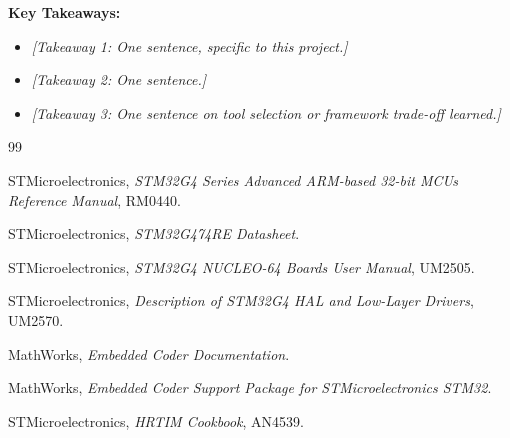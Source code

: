 \textbf{Key Takeaways:}

\begin{itemize}
    \item \textit{[Takeaway 1: One sentence, specific to this project.]}
    \item \textit{[Takeaway 2: One sentence.]}
    \item \textit{[Takeaway 3: One sentence on tool selection or
          framework trade-off learned.]}
\end{itemize}

\newpage

\begin{thebibliography}{99}

STMicroelectronics, \textit{STM32G4 Series Advanced ARM-based
32-bit MCUs Reference Manual}, RM0440.

STMicroelectronics, \textit{STM32G474RE Datasheet}.

STMicroelectronics, \textit{STM32G4 NUCLEO-64 Boards User
Manual}, UM2505.

STMicroelectronics, \textit{Description of STM32G4 HAL and
Low-Layer Drivers}, UM2570.

MathWorks, \textit{Embedded Coder Documentation}.

MathWorks, \textit{Embedded Coder Support Package for
STMicroelectronics STM32}.

STMicroelectronics, \textit{HRTIM Cookbook}, AN4539.

\end{thebibliography}

\newpage
\appendix

